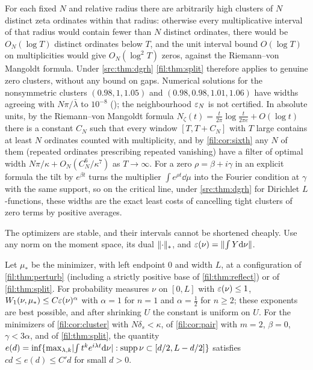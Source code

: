\begin{remark}\label{fil:rem:clusters}
For each fixed $N$ and relative radius there are arbitrarily high clusters of $N$ distinct zeta
ordinates within that radius: otherwise every multiplicative interval of that radius would contain
fewer than $N$ distinct ordinates, there would be $O_N(\log T)$ distinct ordinates below $T$, and the unit
interval bound $O(\log T)$ on multiplicities would give $O_N(\log^2T)$ zeros, against the
Riemann--von Mangoldt formula. Under \cref{src:thm:dgrh} \cref{fil:thm:split} therefore applies to genuine
zero clusters, without any bound on gaps. Numerical solutions for the nonsymmetric clusters
$(0.98,1,1.05)$ and $(0.98,0.98,1.01,1.06)$ have widths agreeing with $N\pi/\bar\lambda$ to $10^{-8}$
(); the neighbourhood $\varepsilon_N$ is not certified.
In absolute units, by the Riemann--von Mangoldt formula $N_\zeta(t)=\frac t{2\pi}\log\frac t{2\pi e}+O(\log t)$ there is
a constant $C_N$ such that every window $[T,T+C_N]$ with $T$ large contains at least $N$ ordinates counted with
multiplicity, and by \cref{fil:cor:sixth} any $N$ of them (repeated ordinates prescribing repeated vanishing)
have a filter of optimal width $N\pi/\kappa+O_N(C_N^6/\kappa^7)$ as $T\to\infty$. For a zero
$\rho=\beta+i\gamma$ in an explicit formula the tilt by $e^{\beta t}$ turns the multiplier $\int e^{\rho t}\dd\mu$ into the
Fourier condition at $\gamma$ with the same support, so on the critical line, under \cref{src:thm:dgrh} for Dirichlet
$L$-functions, these widths are the exact least costs of cancelling tight clusters of zero terms by positive
averages.
\end{remark}

The optimizers are stable, and their intervals cannot be shortened cheaply. Use any norm on the moment
space, its dual $\lVert\cdot\rVert_*$, and $\varepsilon(\nu)=\lVert\int Y\mathrm{d}\nu\rVert$.

\begin{theorem}\label{fil:thm:stable}\label{rec:prop:fstable}
Let $\mu_*$ be the minimizer, with left endpoint $0$ and width $L$, at a configuration of
\cref{fil:thm:perturb} (including a strictly positive base of \cref{fil:thm:reflect}) or of
\cref{fil:thm:split}. For probability measures $\nu$ on $[0,L]$ with $\varepsilon(\nu)\le1$,
$W_1(\nu,\mu_*)\le C\varepsilon(\nu)^\alpha$ with $\alpha=1$ for $n=1$ and $\alpha=\tfrac12$ for $n\ge2$; these
exponents are best possible, and after shrinking $U$ the constant is uniform on $U$. For the minimizers
of \cref{fil:cor:cluster} with $N\delta_s<\kappa$, of \cref{fil:cor:pair} with $m=2$, $\beta=0$,
$\gamma<3\alpha$, and of \cref{fil:thm:split}, the quantity
$e(d)=\inf\{\max_{\lambda,k}\lvert\int t^ke^{i\lambda t}\mathrm{d}\nu\rvert:\operatorname{supp}\nu\subset[d/2,L-d/2]\}$ satisfies
$cd\le e(d)\le C'd$ for small $d>0$.
\end{theorem}

